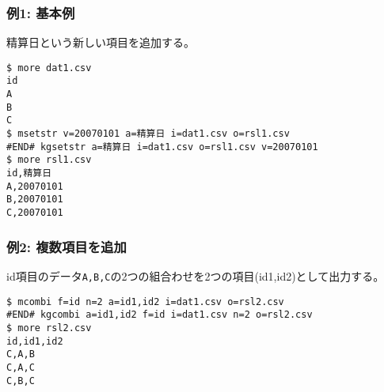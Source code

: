\subsubsection*{例1: 基本例}

精算日という新しい項目を追加する。


\begin{Verbatim}[baselinestretch=0.7,frame=single]
$ more dat1.csv
id
A
B
C
$ msetstr v=20070101 a=精算日 i=dat1.csv o=rsl1.csv
#END# kgsetstr a=精算日 i=dat1.csv o=rsl1.csv v=20070101
$ more rsl1.csv
id,精算日
A,20070101
B,20070101
C,20070101
\end{Verbatim}
\subsubsection*{例2: 複数項目を追加}

id項目のデータ\verb|A,B,C|の2つの組合わせを2つの項目(id1,id2)として出力する。


\begin{Verbatim}[baselinestretch=0.7,frame=single]
$ mcombi f=id n=2 a=id1,id2 i=dat1.csv o=rsl2.csv
#END# kgcombi a=id1,id2 f=id i=dat1.csv n=2 o=rsl2.csv
$ more rsl2.csv
id,id1,id2
C,A,B
C,A,C
C,B,C
\end{Verbatim}
